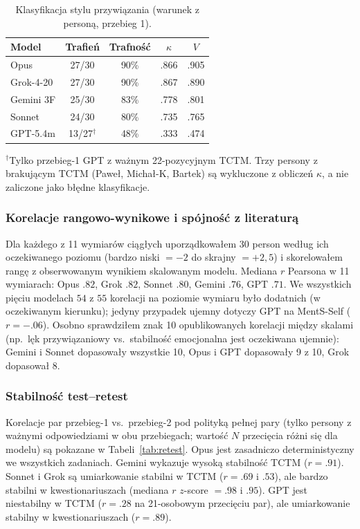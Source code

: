 \documentclass[11pt,a4paper]{article}
\begin{document}
\begin{table}[htbp]\centering\footnotesize
\caption{Klasyfikacja stylu przywiązania (warunek z personą, przebieg 1).}
\label{tab:attachment}
\begin{tabular}{lcccc}
\toprule
\textbf{Model} & \textbf{Trafień} & \textbf{Trafność} & $\kappa$ & $V$ \\
\midrule
Opus        & 27/30 & 90\% & .866 & .905 \\
Grok-4-20   & 27/30 & 90\% & .867 & .890 \\
Gemini 3F   & 25/30 & 83\% & .778 & .801 \\
Sonnet      & 24/30 & 80\% & .735 & .765 \\
GPT-5.4m    & 13/27$^{\dagger}$ & 48\% & .333 & .474 \\
\bottomrule
\end{tabular}
\begin{flushleft}
\footnotesize $^{\dagger}$Tylko przebieg-1 GPT z ważnym 22-pozycyjnym TCTM. Trzy persony z brakującym TCTM (Pawe{\l}, Micha{\l}-K, Bartek) są wykluczone z obliczeń $\kappa$, a nie zaliczone jako błędne klasyfikacje.
\end{flushleft}
\end{table}

\subsubsection*{Korelacje rangowo-wynikowe i spójność z literaturą}

Dla każdego z 11 wymiarów ciągłych uporządkowałem 30 person według ich oczekiwanego poziomu (bardzo niski $= -2$ do skrajny $= +2{,}5$) i skorelowałem rangę z obserwowanym wynikiem skalowanym modelu. Mediana $r$ Pearsona w 11 wymiarach: Opus $.82$, Grok $.82$, Sonnet $.80$, Gemini $.76$, GPT $.71$. We wszystkich pięciu modelach $54$ z $55$ korelacji na poziomie wymiaru było dodatnich (w oczekiwanym kierunku); jedyny przypadek ujemny dotyczy GPT na MentS-Self ($r = -.06$). Osobno sprawdziłem znak 10 opublikowanych korelacji między skalami (np.\ lęk przywiązaniowy vs.\ stabilność emocjonalna jest oczekiwana ujemnie): Gemini i Sonnet dopasowały wszystkie 10, Opus i GPT dopasowały 9 z 10, Grok dopasował 8.

\subsubsection*{Stabilność test--retest}

Korelacje par przebieg-1 vs.\ przebieg-2 pod polityką pełnej pary (tylko persony z ważnymi odpowiedziami w obu przebiegach; wartość $N$ przecięcia różni się dla modelu) są pokazane w Tabeli~\ref{tab:retest}. Opus jest zasadniczo deterministyczny we wszystkich zadaniach. Gemini wykazuje wysoką stabilność TCTM ($r = .91$). Sonnet i Grok są umiarkowanie stabilni w TCTM ($r = .69$ i $.53$), ale bardzo stabilni w kwestionariuszach (mediana $r$ $z$-score $= .98$ i $.95$). GPT jest niestabilny w TCTM ($r = .28$ na 21-osobowym przecięciu par), ale umiarkowanie stabilny w kwestionariuszach ($r = .89$).
\end{document}
